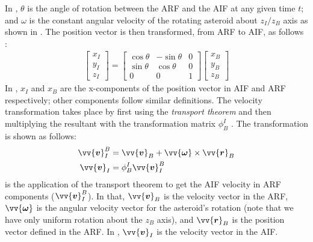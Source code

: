 In , $\theta$ is the angle of rotation between the \gls{ARF} and the \gls{AIF} at any given time $t$; and $\omega$ is the constant angular velocity of the rotating asteroid about $z_I / z_B$ axis as shown in . The position vector is then transformed, from \gls{ARF} to \gls{AIF}, as follows \parencite{schaub2003Book}:
\begin{align}
    \begin{bmatrix}
        x_I \\
        y_I \\
        z_I
    \end{bmatrix}
    =
    \begin{bmatrix}
        \cos\theta & -\sin\theta & 0 \\
        \sin\theta & \cos\theta & 0 \\
        0 & 0 & 1
    \end{bmatrix}
    \begin{bmatrix}
        x_B \\
        y_B \\
        z_B
    \end{bmatrix}
    \label{eqn:arf_to_aif_position_transformation}
\end{align}
In , $x_I$ and $x_B$ are the x-components of the position vector in \gls{AIF} and \gls{ARF} respectively; other components follow similar definitions. The velocity transformation takes place by first using the \textit{transport theorem} and then multiplying the resultant with the transformation matrix $\phi_{B}^{I}$ \parencite{schaub2003Book}. The transformation is shown as follows:
\begin{align}
    \vv{\bm{v}}_{I}^{B} &= \vv{\bm{v}}_{B} + \vv{\bm{\omega}} \times \vv{\bm{r}}_{B}
    \label{eqn:arf_to_aif_transport_theorem} \\
    \vv{\bm{v}}_I &= \phi_B^I \vv{\bm{v}}_I^B
    \label{eqn:arf_to_aif_velocity_transformation}
\end{align}
 is the application of the transport theorem to get the \gls{AIF} velocity in \gls{ARF} components ($\vv{\bm{v}}_{I}^{B}$). In that, $\vv{\bm{v}}_{B}$ is the velocity vector in the \gls{ARF}, $\vv{\bm{\omega}}$ is the angular velocity vector for the asteroid's rotation (note that we have only uniform rotation about the $z_B$ axis), and $\vv{\bm{r}}_{B}$ is the position vector defined in the \gls{ARF}. In , $\vv{\bm{v}}_I$ is the velocity vector in the \gls{AIF}.

